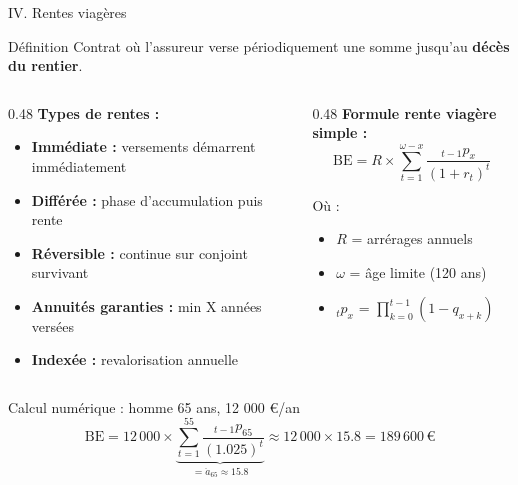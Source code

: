\documentclass[10pt,aspectratio=169]{beamer}
\newcommand{\highlight}[1]{\textbf{\color{rougeactu}#1}}
\newcommand{\BE}{\text{BE}}
\newcommand{\EUR}{€}
\begin{document}
\begin{frame}{IV. Rentes viagères}
\begin{block}{Définition}
Contrat où l'assureur verse périodiquement une somme jusqu'au \highlight{décès du rentier}.
\end{block}

\begin{columns}[T]
\begin{column}{0.48\textwidth}
\textbf{Types de rentes :}
\begin{itemize}
    \item \textbf{Immédiate :} versements démarrent immédiatement
    \item \textbf{Différée :} phase d'accumulation puis rente
    \item \textbf{Réversible :} continue sur conjoint survivant
    \item \textbf{Annuités garanties :} min X années versées
    \item \textbf{Indexée :} revalorisation annuelle
\end{itemize}
\end{column}
\begin{column}{0.48\textwidth}
\textbf{Formule rente viagère simple :}
\[
\boxed{\BE = R \times \sum_{t=1}^{\omega - x} \frac{{}_{t-1}p_x}{(1+r_t)^t}}
\]

Où :
\begin{itemize}
    \item $R$ = arrérages annuels
    \item $\omega$ = âge limite (120 ans)
    \item ${}_{t}p_x$ = $\prod_{k=0}^{t-1}(1-q_{x+k})$
\end{itemize}
\end{column}
\end{columns}

\vspace{0.3cm}
\begin{exampleblock}{Calcul numérique : homme 65 ans, 12 000 \EUR/an}
\[
\BE = 12\,000 \times \underbrace{\sum_{t=1}^{55} \frac{{}_{t-1}p_{65}}{(1.025)^t}}_{= \ddot{a}_{65} \approx 15.8} \approx 12\,000 \times 15.8 = \boxed{189\,600\, \EUR}
\]
\end{exampleblock}
\end{frame}
\end{document}

